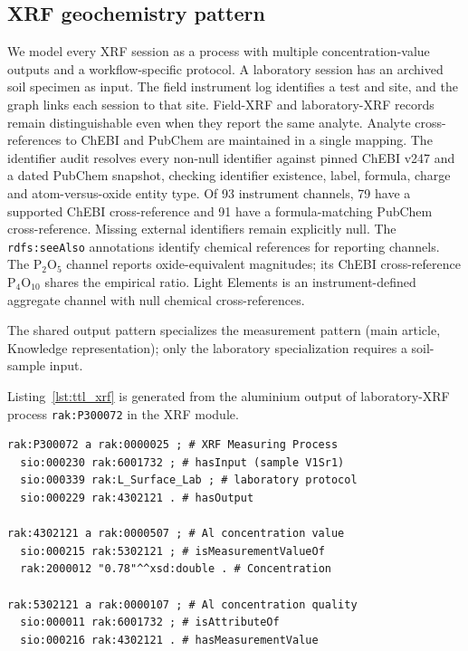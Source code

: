 \subsection{XRF geochemistry pattern}

We model every XRF session as a process with multiple
concentration-value outputs and a workflow-specific protocol. A
laboratory session has an archived soil specimen as input. The field
instrument log identifies a test and site, and the graph links each
session to that site. Field-XRF and laboratory-XRF records remain
distinguishable even when they report the same analyte.
Analyte cross-references to ChEBI \cite{chebi} and PubChem
\cite{pubchem} are maintained in a single mapping. The
identifier audit resolves every non-null identifier against pinned
ChEBI v247 and a dated PubChem snapshot, checking identifier
existence, label, formula, charge and atom-versus-oxide entity type.
Of 93 instrument channels, 79 have a supported ChEBI cross-reference
and 91 have a formula-matching PubChem cross-reference. Missing external identifiers remain explicitly null. The \texttt{rdfs:seeAlso} annotations identify chemical references
for reporting channels. The P$_2$O$_5$ channel reports oxide-equivalent
magnitudes; its ChEBI cross-reference P$_4$O$_{10}$ shares the
empirical ratio. Light Elements is an instrument-defined aggregate
channel with null chemical cross-references.

The shared output pattern specializes the measurement pattern
(main article, Knowledge representation); only the laboratory specialization
requires a soil-sample input.



Listing~\ref{lst:ttl_xrf} is generated from the aluminium output of
laboratory-XRF process \texttt{rak:P300072} in the XRF module.

\begin{lstlisting}[caption={Turtle representation of an XRF geochemistry measurement.}, label={lst:ttl_xrf}, basicstyle=\ttfamily\scriptsize, frame=single]
rak:P300072 a rak:0000025 ; # XRF Measuring Process
  sio:000230 rak:6001732 ; # hasInput (sample V1Sr1)
  sio:000339 rak:L_Surface_Lab ; # laboratory protocol
  sio:000229 rak:4302121 . # hasOutput

rak:4302121 a rak:0000507 ; # Al concentration value
  sio:000215 rak:5302121 ; # isMeasurementValueOf
  rak:2000012 "0.78"^^xsd:double . # Concentration

rak:5302121 a rak:0000107 ; # Al concentration quality
  sio:000011 rak:6001732 ; # isAttributeOf
  sio:000216 rak:4302121 . # hasMeasurementValue
\end{lstlisting}

